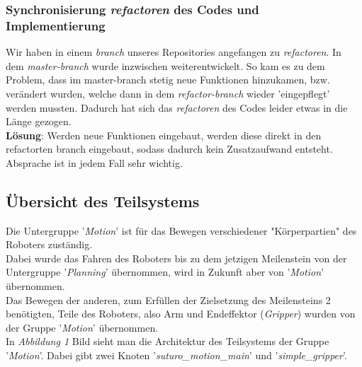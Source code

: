 \documentclass{suturo}
\begin{document}
\subsubsection*{Synchronisierung \textit{refactoren} des Codes und Implementierung}
Wir haben in einem \textit{branch} unseres Repositories angefangen zu \textit{refactoren}. In dem \textit{master-branch} wurde inzwischen weiterentwickelt. So kam es zu dem Problem, dass im master-branch stetig neue Funktionen hinzukamen, bzw. verändert wurden, welche dann in dem \textit{refactor-branch} wieder 'eingepflegt' werden mussten. Dadurch hat sich das \textit{refactoren} des Codes leider etwas in die Länge gezogen.\\
\textbf{Lösung}: Werden neue Funktionen eingebaut, werden diese direkt in den refactorten branch eingebaut, sodass dadurch kein Zusatzaufwand entsteht. Absprache ist in jedem Fall sehr wichtig.


\subsection{Übersicht des Teilsystems}
Die Untergruppe '\textit{Motion}' ist für das Bewegen verschiedener "Körperpartien" des Roboters zuständig.\\
Dabei wurde das Fahren des Roboters bis zu dem jetzigen Meilenstein von der Untergruppe '\textit{Planning}' übernommen, wird
in Zukunft aber von '\textit{Motion}' übernommen.\\
Das Bewegen der anderen, zum Erfüllen der Zielsetzung des Meilensteins 2 benötigten, Teile des Roboters, also Arm und Endeffektor (\textit{Gripper}) wurden 
von der Gruppe '\textit{Motion}' übernommen.\\

In \textit{Abbildung 1} Bild sieht man die Architektur des Teilsystems der Gruppe '\textit{Motion}'. Dabei gibt zwei Knoten '\textit{suturo\_motion\_main}' und '\textit{simple\_gripper}'.\\

\begin{figure}[!htb]
\end{figure}
\end{document}
